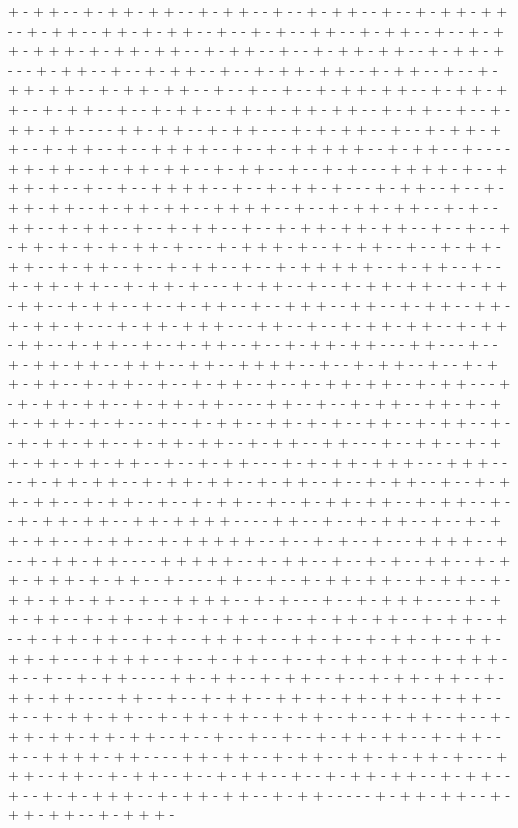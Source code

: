+ - + + - - + - + + - + + - - + - + + - - + - - + - + + - - + - - + - + + - + + - - + - + + - - + + - + - + + - - + - - + - + - - + + - - + - + + - - + - - + - + + - + + + - + - + + - + + - - + - + + - - + - - + - + + - + + - - + - + + - + - - - + - + + - - + - - + - + + - - + - - + - + + - + + - - + - + + - - + - - + - + + - + + - - + - + + - + + - - + - - + - - + - - + - + + - + + - - + - + + - + + - - + - + + - - + - - + - + + - - + + - + - + + - + + - - + - + + - - + - - + - + + - + + - - - - + + - + + - - + - + + - - - + - + - + + - - + - - + - + + - + + - - + - + + - - + - - + + + + - - + - - + - + + + + + - - + - + + - - + - - - - + + - + + - - + - + + - + + - - + - + + - - + - - + - + - - - + + + + - + - - + + + - + - - + - - + - - + + + + - - + - - + - + + - + - - - + - + + - - + - - + - + + - + + - - + - + + - + + - - + + + + - - + - - + - + + - + + - - + - + - - + + - - + - + + - - + - - + - + + - - + - - + - + + - + + - + + - - + - - + - - + - + + - + - + - + - + + - + - - - + - + + + - + - - + - + + - - + - - + - + + - + + - - + - + + - - + - - + - + + - - + - - + - + + + + + - - + - + + - - + - - + - + + - + + - - + - + + - + - - - + - + + - - + - - + - + + - + + - - + - + + - + + - - + - + + - - + - - + - + + - - + - - + + + - - + + - - + - + + - - + + - + - + + - + - - - + - + + - + + + - - - + + - - + - - + - + + - + + - - + - + + - + + - - + - + + - - + - - + - + + - - + - - + - + + - + + - - - + + - - - + - - + - + + - + + - - + + + - - + + - - + + + + - - + - - + - + + - - + - - + - + + - + + - - + - + + - - + - - + - + + - - + - - + - + + - + + - - + - + + - - - + - + - + + - + + - - + - + + - + + - - - - + + - - + - - + - + + - - + + - + - + + - + + + - + - + - - - + - - + - + + - - + + - + - + - - + + - - + - + + - - + - - + - + + - + + - - + - + + - + + - - + - + + - - + + - - - + - - + + - - + - + + - + + - + + - + + - - + - - + - + + - - - + - + - + + - + + + - - - + + + - - - - + - + + - + + - - + - + + - + + - - + - + + - - + - - + - + + - - + - - + - + + - + + - - + - + + - - + - - + - + + - - + - - + - + + - + + - - + - + + - - + - - + - + + - + + - - + + - + + + + - - - - + + - - + - - + - + + - - + - - + - + + - + + - - + - + + - - + - + + + + + - - + - - + - + - - + - - - + + + + - - + - - + - + + - + + - - - - + + + + + - - + - + + - - + - - + - + - - + + - - + - + + - + + + - + - + + - - + - - - - + + - - + - - + - + + - + + - - + - + + - - + - + + - + + - + + - - + - - + + + + - - + - + - - - + - - + - + + + - - - - + - + + - + + - - + - + + - - + + - + - + + - - + - - + - + + - + + - - + - + + - - + - - + - + + - + + - - + - + - - + + + - + - - + + - + - - + - + + - + - - + + - + + - + - - - + + + + - - + - - + - + + - - + - - + - + + - + + - - + - + + + - + - - + - - + - + + - - - - + + - + + - - + - + + - - + - - + - + + - + + - - + - + + - + + - - - - + + - - + - - + - + + - - + + - + - + + - + + - - + - + + - - + - - + - + + - + + - - + - + + - + + - - + - + + - - + - - + - + + - - + - - + - + + - + + - + + - + + - - + - - + - - + - - + - - + - + + - + + - - + - + + - - + - - + + + + - + + - - - - + + - + + - - + - + + - - + + - + - + + - + - - - + + + - - + + - - + - + + - - + - - + - + + - - + - - + - + + - + + - - + - + + - - + - - + - + - + + + - - + - + + - + + - - + - + + - - - - - + - + + - + + - - + - + + - + + - - + - + + + - 
